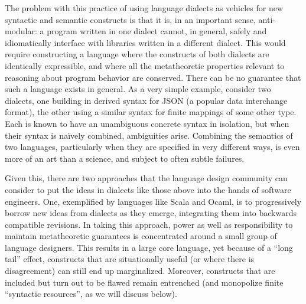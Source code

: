 The problem with this practice of using language dialects as vehicles for new syntactic and semantic constructs is that it is, in an important sense,  anti-modular: a program written in one dialect cannot, in general, safely and idiomatically interface with libraries written in a different dialect. %
This would require constructing a language where the constructs of both dialects are identically expressible, and where all the metatheoretic properties relevant to reasoning about program behavior are conserved. There can be no guarantee that such a language exists in general. As a very simple example, consider two dialects, one building in derived syntax for JSON (a popular data interchange format), the other using a similar syntax for finite mappings of some other type. Each is known to have an unambiguous concrete syntax in isolation, but when their syntax is na\"ively  combined, ambiguities arise. Combining the semantics of two languages, particularly when they are specified in very different ways, is even more of an art than a science, and subject to often subtle failures. %

Given this, there are two approaches that the language design community can consider to put the ideas in dialects like those above into the hands of software engineers. One, exemplified by languages like Scala and Ocaml, is to progressively borrow new ideas from dialects as they emerge, integrating them into backwards compatible revisions. In taking this approach, power as well as responsibility to maintain metatheoretic guarantees is concentrated around a small group of language designers. This results in a large core language, yet because of a ``long tail'' effect, constructs that are situationally useful (or where there is disagreement) can still end up marginalized. Moreover, constructs that are included but turn out to be  flawed remain entrenched (and monopolize finite ``syntactic resources'', as we will discuss below). %

